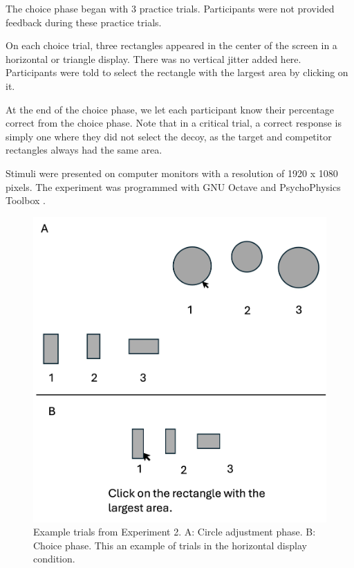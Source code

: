 \documentclass{umassthesis}          %
\begin{document}
The choice phase began with 3 practice trials. Participants were not provided feedback during these practice trials. 

On each choice trial, three rectangles appeared in the center of the screen in a horizontal or triangle display. There was no vertical jitter added here. Participants were told to select the rectangle with the largest area by clicking on it.

At the end of the choice phase, we let each participant know their percentage correct from the choice phase. Note that in a critical trial, a correct response is simply one where they did not select the decoy, as the target and competitor rectangles always had the same area.

Stimuli were presented on computer monitors with a resolution of 1920 x 1080 pixels. The experiment was programmed with GNU Octave \parencite{octave} and PsychoPhysics Toolbox \parencite{brainardPsychophysicsToolbox1997}. 

\begin{figure}
   \includegraphics[width=\linewidth]{figures/circle_exp_display.jpg}
   \caption{Example trials from Experiment 2. A: Circle adjustment phase. B: Choice phase. This an example of trials in the horizontal display condition.}
   \label{fig:circle_exp_display}
\end{figure}
\end{document}
